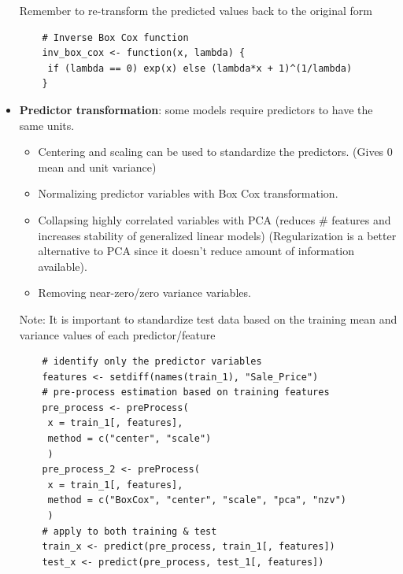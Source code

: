 \documentclass[12pt, oneside]{article}
\begin{document}
\begin{itemize}
    Remember to re-transform the predicted values back to the original form
    
    \begin{lstlisting}
    # Inverse Box Cox function
    inv_box_cox <- function(x, lambda) {
     if (lambda == 0) exp(x) else (lambda*x + 1)^(1/lambda)
    }
    \end{lstlisting}
    
    \item \textbf{Predictor transformation}: some models require predictors to have the same units. 
    \begin{itemize}
        \item Centering and scaling can be used to standardize the predictors. (Gives 0 mean and unit variance)
        \item Normalizing predictor variables with Box Cox transformation.
        \item Collapsing highly correlated variables with PCA (reduces \# features and increases stability of generalized linear models) (Regularization is a better alternative to PCA since it doesn't reduce amount of information available).
        \item Removing near-zero/zero variance variables.
    \end{itemize} 

    Note: It is important to standardize test data based on the training mean and variance values of each predictor/feature
    
    \begin{verbatim}
    # identify only the predictor variables
    features <- setdiff(names(train_1), "Sale_Price")
    # pre-process estimation based on training features
    pre_process <- preProcess(
     x = train_1[, features],
     method = c("center", "scale")
     )
    pre_process_2 <- preProcess(
     x = train_1[, features],
     method = c("BoxCox", "center", "scale", "pca", "nzv")
     )
    # apply to both training & test
    train_x <- predict(pre_process, train_1[, features])
    test_x <- predict(pre_process, test_1[, features])    
    \end{verbatim}
\end{itemize}
 \newpage   
\end{document}
